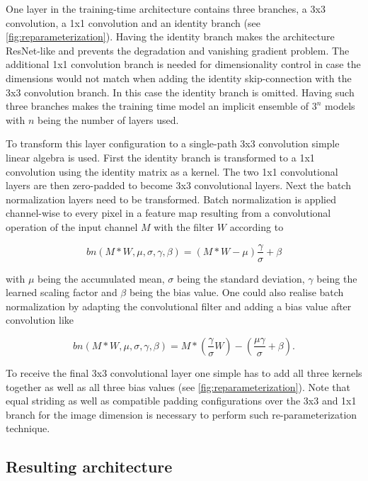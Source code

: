 One layer in the training-time architecture contains three branches, a 3x3 convolution, a 1x1 convolution and an identity branch (see \autoref{fig:reparameterization}). Having the identity branch makes the architecture ResNet-like and prevents the degradation and vanishing gradient problem. The additional 1x1 convolution branch is needed for dimensionality control in case the dimensions would not match when adding the identity skip-connection with the 3x3 convolution branch. In this case the identity branch is omitted. Having such three branches makes the training time model an implicit ensemble of $3^n$ models with $n$ being the number of layers used. 

To transform this layer configuration to a single-path 3x3 convolution simple linear algebra is used. First the identity branch is transformed to a 1x1 convolution using the identity matrix as a kernel. The two 1x1 convolutional layers are then zero-padded to become 3x3 convolutional layers. Next the batch normalization layers need to be transformed. Batch normalization is applied channel-wise to every pixel in a feature map resulting from a convolutional operation of the input channel $M$ with the filter $W$ according to 

\begin{equation} \label{eq:batchnormalization}
	bn(M*W, \mu, \sigma, \gamma, \beta) = (M*W - \mu)\frac{\gamma}{\sigma} + \beta
\end{equation}

with $\mu$ being the accumulated mean, $\sigma$ being the standard deviation, $\gamma$ being the learned scaling factor and $\beta$ being the bias value. One could also realise batch normalization by adapting the convolutional filter and adding a bias value after convolution like 

\begin{equation} \label{eq:batchnormalizationtransformed}
	bn(M*W, \mu, \sigma, \gamma, \beta) = M*(\frac{\gamma}{\sigma}W) - (\frac{\mu\gamma}{\sigma} + \beta).
\end{equation}

To receive the final 3x3 convolutional layer one simple has to add all three kernels together as well as all three bias values (see \autoref{fig:reparameterization}). Note that equal striding as well as compatible padding configurations over the 3x3 and 1x1 branch for the image dimension is necessary to perform such re-parameterization technique. 

\subsection{Resulting architecture}

